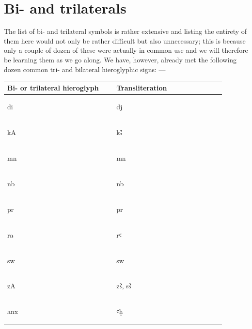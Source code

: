 \documentclass[a5paper,twoside,11pt]{report}
\newcommand{\AHiero}{{\fontspec{DejaVu Sans}Ꜣ}}
\newcommand{\aHiero}{{\fontspec{DejaVu Sans}ꜥ}}
\newcommand{\xHiero}{ḫ}
\begin{document}
\chapter*{Bi- and trilaterals}

    The list of bi- and trilateral symbols is rather extensive and listing the entirety of them here would not only be rather difficult but also unnecessary; this is because only a couple of dozen of these were actually in common use and we will therefore be learning them as we go along. 
    We have, however, already met the following dozen common tri- and bilateral hieroglyphic signs: —

    \begin{center}
      \begin{longtable}{p{0.45\linewidth} | p{0.45\linewidth}}
        Bi- or trilateral hieroglyph & Transliteration \\ [0.5ex]
        \hline\hline
        \begin{hieroglyph}di\end{hieroglyph} & dj \\
        \hline
        \begin{hieroglyph}kA\end{hieroglyph} & k\AHiero \\
        \hline
        \begin{hieroglyph}mn\end{hieroglyph} & mn \\
        \hline
        \begin{hieroglyph}nb\end{hieroglyph} & nb \\
        \hline
        \begin{hieroglyph}pr\end{hieroglyph} & pr \\
        \hline
        \begin{hieroglyph}ra\end{hieroglyph} & r\aHiero \\
        \hline
        \begin{hieroglyph}sw\end{hieroglyph} & sw \\
        \hline
        \begin{hieroglyph}zA\end{hieroglyph} & z\AHiero, s\AHiero \\
        \hline
        \begin{hieroglyph}anx\end{hieroglyph} & \aHiero\xHiero\\

\end{longtable}
\end{center}
\end{document}
